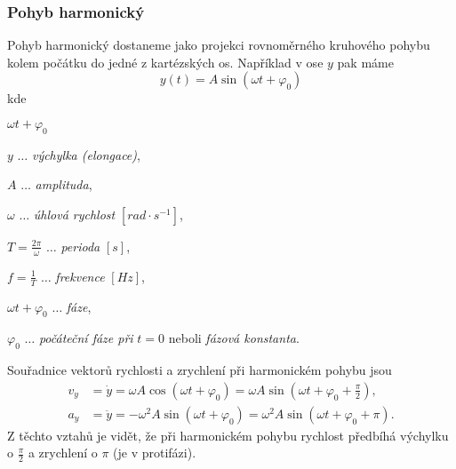       \subsubsection{Pohyb harmonický}
        Pohyb harmonický dostaneme jako projekci rovnoměrného kruhového pohybu kolem počátku do
        jedné z kartézských os. Například v ose $y$ pak máme
        \begin{equation}\label{mech:eq_p_harmon}
          y(t)=A\sin(\omega t+\varphi_0)
        \end{equation}
        kde 
        \begin{labeling}{$\omega t+\varphi_0$}
          \setlength{\itemindent}{2cm}
          \item[\(y\)]                     \(\ldots\) \emph{výchylka (elongace)}, 
          \item[\(A\)]                     \(\ldots\) \emph{amplituda}, 
          \item[\(\omega\)]                \(\ldots\) \emph{úhlová rychlost} $[rad\cdot s^{-1}]$,
          \item[\(T=\frac{2\pi}{\omega}\)] \(\ldots\) \emph{perioda} $[s]$, 
          \item[\(f=\frac{1}{T}\)]         \(\ldots\) \emph{frekvence} $[Hz]$, 
          \item[\(\omega t+\varphi_0\)]    \(\ldots\) \emph{fáze}, 
          \item[\(\varphi_0\)]             \(\ldots\) \emph{počáteční fáze při} $t=0$ neboli
                                                      \emph{fázová konstanta}.
        \end{labeling}
  
        Souřadnice vektorů rychlosti a zrychlení při harmonickém pohybu jsou
        \begin{subequations}
          \label{mech:eq_harm} 
          \begin{align}
            v_y &= \dot{y} 
                 = \omega A\cos(\omega t+\varphi_0 )
                 = \omega A\sin(\omega t+\varphi_0+\frac{\pi}{2}), \label{mech:eq_harm_vy}        \\
            a_y &= \ddot{y} 
                 = -\omega^2A\sin(\omega t+\varphi_0 ) 
                 =  \omega^2A\sin(\omega t+\varphi_0+\pi).          \label{mech:eq_harm_ay}
          \end{align}
        \end{subequations}  
        Z těchto vztahů je vidět, že při harmonickém pohybu rychlost předbíhá výchylku o
        $\frac{\pi}{2}$ a zrychlení o $\pi$ (je v protifázi).

